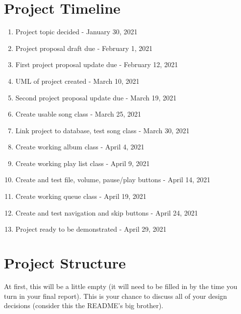 \documentclass[10pt,conference,onecolumn,compsoc]{IEEEtran}
\begin{document}
\section{Project Timeline}
\begin{enumerate}
\item Project topic decided - January 30, 2021
\item Project proposal draft due - February 1, 2021
\item First project proposal update due - February 12, 2021
\item UML of project created - March 10, 2021
\item Second project proposal update due - March 19, 2021
\item Create usable song class - March 25, 2021
\item Link project to database, test song class - March 30, 2021
\item Create working album class - April 4, 2021
\item Create working play list class - April 9, 2021
\item Create and test file, volume, pause/play buttons - April 14, 2021
\item Create working queue class - April 19, 2021
\item Create and test navigation and skip buttons - April 24, 2021
\item Project ready to be demonstrated - April 29, 2021
\end{enumerate}

\section{Project Structure}
At first, this will be a little empty (it will need to be filled in by the time you turn in your final report).  This is your chance to discuss all of your design decisions (consider this the README's big brother).
\end{document}

